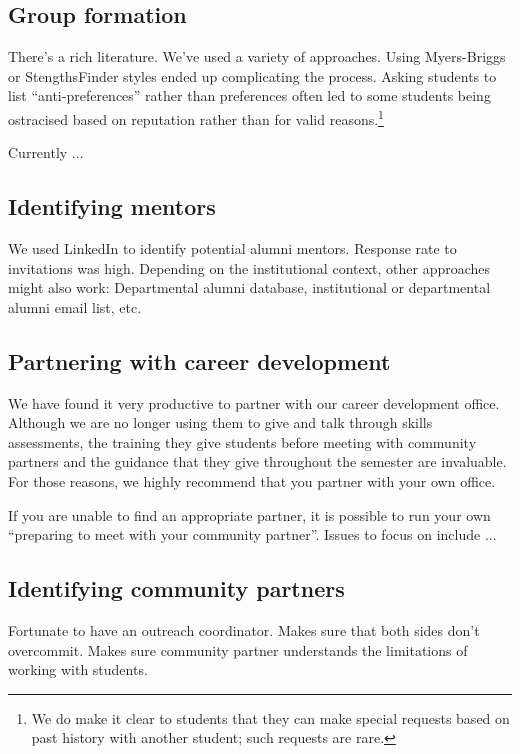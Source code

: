 \subsection{Group formation}

There's a rich literature.  We've used a variety of approaches.  Using
Myers-Briggs or StengthsFinder styles ended up complicating the process.
Asking students to list ``anti-preferences'' rather than preferences
often led to some students being ostracised based on reputation rather
than for valid reasons.\footnote{We do make it clear to students that
they can make special requests based on past history with another student;
such requests are rare.}

Currently ...

\subsection{Identifying mentors}

We used LinkedIn to identify potential alumni mentors.  Response rate
to invitations was high.  Depending on the institutional context, other
approaches might also work: Departmental alumni database, institutional
or departmental alumni email list, etc.

\subsection{Partnering with career development}

We have found it very productive to partner with our career development
office.  Although we are no longer using them to give and talk through
skills assessments, the training they give students before meeting with
community partners and the guidance that they give throughout the semester
are invaluable.  For those reasons, we highly recommend that you partner
with your own office.

If you are unable to find an appropriate partner, it is possible to run
your own ``preparing to meet with your community partner''.  Issues to
focus on include ...


\subsection{Identifying community partners}

Fortunate to have an outreach coordinator.  Makes sure that both sides
don't overcommit.  Makes sure community partner understands the limitations
of working with students.


